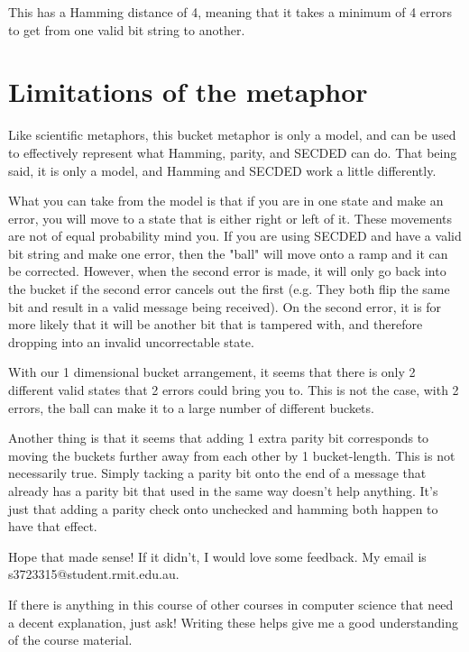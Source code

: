 \documentclass{article}
\begin{document}
   This has a Hamming distance of 4, meaning that it takes a minimum of 4 errors to get from one valid bit string to another.

   \section*{Limitations of the metaphor}
   Like scientific metaphors, this bucket metaphor is only a model, and can be used to effectively represent what Hamming, parity, and SECDED can do. That being said, it is only a model, and Hamming and SECDED work a little differently.

   What you can take from the model is that if you are in one state and make an error, you will move to a state that is either right or left of it. These movements are not of equal probability mind you. If you are using SECDED and have a valid bit string and make one error, then the "ball" will move onto a ramp and it can be corrected. However, when the second error is made, it will only go back into the bucket if the second error cancels out the first (e.g. They both flip the same bit and result in a valid message being received). On the second error, it is for more likely that it will be another bit that is tampered with, and therefore dropping into an invalid uncorrectable state.

  With our 1 dimensional bucket arrangement, it seems that there is only 2 different valid states that 2 errors could bring you to. This is not the case, with 2 errors, the ball can make it to a large number of different buckets.

  Another thing is that it seems that adding 1 extra parity bit corresponds to moving the buckets further away from each other by 1 bucket-length. This is not necessarily true. Simply tacking a parity bit onto the end of a message that already has a parity bit that used in the same way doesn't help anything. It's just that adding a parity check onto unchecked and hamming both happen to have that effect.

  Hope that made sense! If it didn't, I would love some feedback. My email is s3723315@student.rmit.edu.au.
  
  If there is anything in this course of other courses in computer science that need a decent explanation, just ask! Writing these helps give me a good understanding of the course material.
\end{document}
